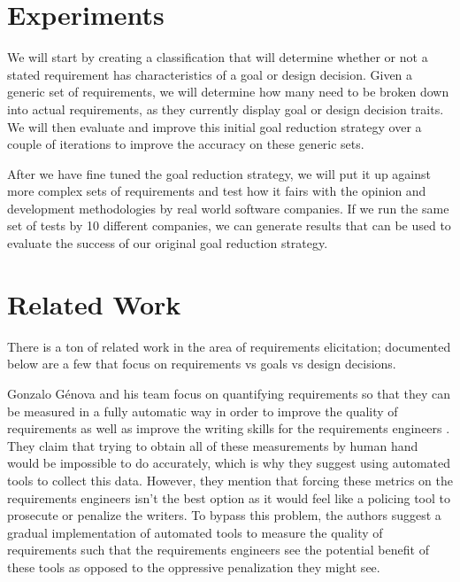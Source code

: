 \documentclass[format=acmlarge]{acmart}
\begin{document}
\section{Experiments}
We will start by creating a classification that will determine whether or not a stated requirement has characteristics of a goal or design decision. Given a generic set of requirements, we will determine how many need to be broken down into actual requirements, as they currently display goal or design decision traits. We will then evaluate and improve this initial goal reduction strategy over a couple of iterations to improve the accuracy on these generic sets.

After we have fine tuned the goal reduction strategy, we will put it up against more complex sets of requirements and test how it fairs with the opinion and development methodologies by real world software companies. If we run the same set of tests by 10 different companies, we can generate results that can be used to evaluate the success of our original goal reduction strategy.

\section{Related Work}
There is a ton of related work in the area of requirements elicitation; documented below are a few that focus on requirements vs goals vs design decisions.

Gonzalo G{\'e}nova and his team focus on quantifying requirements so that they can be measured in a fully automatic way in order to improve the quality of requirements as well as improve the writing skills for the requirements engineers \cite{Génova2013}. They claim that trying to obtain all of these measurements by human hand would be impossible to do accurately, which is why they suggest using automated tools to collect this data. However, they mention that forcing these metrics on the requirements engineers isn't the best option as it would feel like a policing tool to prosecute or penalize the writers. To bypass this problem, the authors suggest a gradual implementation of automated tools to measure the quality of requirements such that the requirements engineers see the potential benefit of these tools as opposed to the oppressive penalization they might see.
\end{document}
